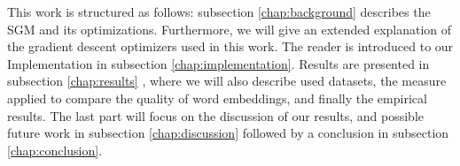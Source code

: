 This work is structured as follows: subsection \ref{chap:background}  describes the SGM and its optimizations. Furthermore, we will give an extended explanation of the gradient descent optimizers used in this work. The reader is introduced to our Implementation in subsection \ref{chap:implementation}. Results are presented in  subsection \ref{chap:results} , where we will also describe used datasets, the measure applied to compare the quality of word embeddings, and finally the empirical results. The last part will focus on the discussion of our results, and possible future work in subsection \ref{chap:discussion} followed by a conclusion in subsection \ref{chap:conclusion}.